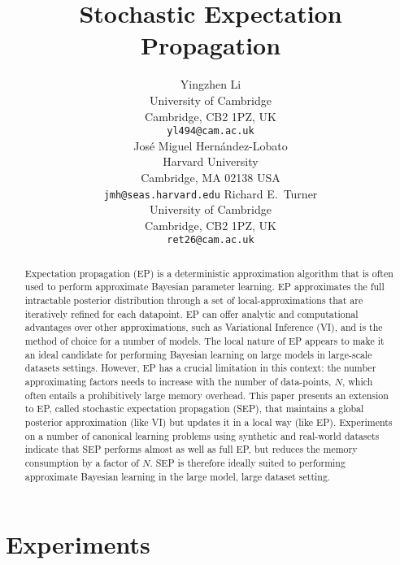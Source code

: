 \documentclass{article} %
\title{Stochastic Expectation Propagation}
\author{
Yingzhen Li \\
University of Cambridge\\
Cambridge, CB2 1PZ, UK \\
\texttt{yl494@cam.ac.uk} \\
\And
Jos\'e Miguel Hern\'andez-Lobato\\
Harvard University \\
Cambridge, MA 02138 USA \\
\texttt{jmh@seas.harvard.edu}
\And
Richard E.~Turner \\
University of Cambridge\\
Cambridge, CB2 1PZ, UK \\
\texttt{ret26@cam.ac.uk} \\
}
\begin{document}
\maketitle

\begin{abstract}
Expectation propagation (EP) is a deterministic approximation algorithm that is often used to perform approximate Bayesian parameter learning. EP approximates the full intractable posterior distribution through a set of local-approximations that are iteratively refined for each datapoint. EP can offer analytic and computational advantages over other approximations, such as Variational Inference (VI), and is the method of choice for a number of models. The local nature of EP appears to make it an ideal candidate for performing Bayesian learning on large models in large-scale datasets settings. However, EP has a crucial limitation in this context: the number approximating factors needs to increase with the number of data-points, $N$, which often entails a prohibitively large memory overhead. This paper presents an extension to EP, called stochastic expectation propagation (SEP), that maintains a global posterior approximation (like VI) but updates it in a local way (like EP).  Experiments on a number of canonical learning problems using synthetic and real-world datasets indicate that SEP performs almost as well as full EP, but reduces the memory consumption by a factor of $N$. SEP is therefore ideally suited to performing approximate Bayesian learning in the large model, large dataset setting.

\end{abstract}







%

%

\section{Experiments}

\end{document}
